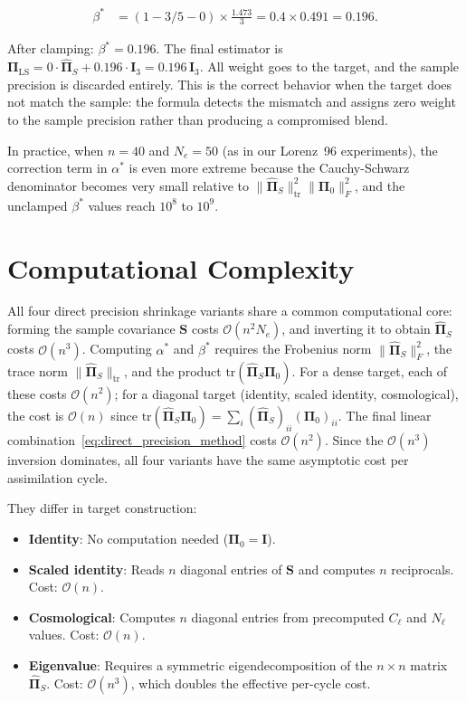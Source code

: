 \begin{align*}
\beta^* &= (1 - 3/5 - 0) \times \frac{1.473}{3} = 0.4 \times 0.491 = 0.196.
\end{align*}

After clamping: $\beta^* = 0.196$. The final estimator is $\boldsymbol{\Pi}_{\text{LS}} = 0 \cdot \hat{\boldsymbol{\Pi}}_S + 0.196 \cdot \mathbf{I}_3 = 0.196 \, \mathbf{I}_3$. All weight goes to the target, and the sample precision is discarded entirely. This is the correct behavior when the target does not match the sample: the formula detects the mismatch and assigns zero weight to the sample precision rather than producing a compromised blend.

In practice, when $n = 40$ and $N_e = 50$ (as in our Lorenz~96 experiments), the correction term in $\alpha^*$ is even more extreme because the Cauchy-Schwarz denominator becomes very small relative to $\|\hat{\boldsymbol{\Pi}}_S\|_{\text{tr}}^2 \|\boldsymbol{\Pi}_0\|_F^2$, and the unclamped $\beta^*$ values reach $10^8$ to $10^9$.

\section{Computational Complexity}
\label{sec:complexity}

All four direct precision shrinkage variants share a common computational core: forming the sample covariance $\mathbf{S}$ costs $\mathcal{O}(n^2 N_e)$, and inverting it to obtain $\hat{\boldsymbol{\Pi}}_S$ costs $\mathcal{O}(n^3)$. Computing $\alpha^*$ and $\beta^*$ requires the Frobenius norm $\|\hat{\boldsymbol{\Pi}}_S\|_F^2$, the trace norm $\|\hat{\boldsymbol{\Pi}}_S\|_{\text{tr}}$, and the product $\text{tr}(\hat{\boldsymbol{\Pi}}_S \boldsymbol{\Pi}_0)$. For a dense target, each of these costs $\mathcal{O}(n^2)$; for a diagonal target (identity, scaled identity, cosmological), the cost is $\mathcal{O}(n)$ since $\text{tr}(\hat{\boldsymbol{\Pi}}_S \boldsymbol{\Pi}_0) = \sum_i (\hat{\boldsymbol{\Pi}}_S)_{ii} (\boldsymbol{\Pi}_0)_{ii}$. The final linear combination~\eqref{eq:direct_precision_method} costs $\mathcal{O}(n^2)$. Since the $\mathcal{O}(n^3)$ inversion dominates, all four variants have the same asymptotic cost per assimilation cycle.

They differ in target construction:
\begin{itemize}
\item \textbf{Identity}: No computation needed ($\boldsymbol{\Pi}_0 = \mathbf{I}$).
\item \textbf{Scaled identity}: Reads $n$ diagonal entries of $\mathbf{S}$ and computes $n$ reciprocals. Cost: $\mathcal{O}(n)$.
\item \textbf{Cosmological}: Computes $n$ diagonal entries from precomputed $C_\ell$ and $N_\ell$ values. Cost: $\mathcal{O}(n)$.
\item \textbf{Eigenvalue}: Requires a symmetric eigendecomposition of the $n \times n$ matrix $\hat{\boldsymbol{\Pi}}_S$. Cost: $\mathcal{O}(n^3)$, which doubles the effective per-cycle cost.
\end{itemize}


